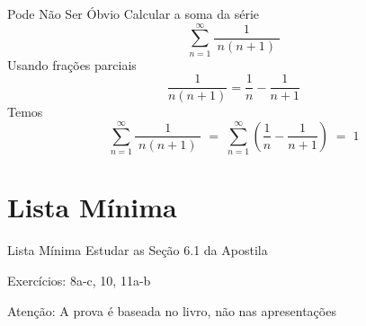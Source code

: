 \begin{frame}{Pode Não Ser Óbvio}
	Calcular a soma da série
	\[\sum_{n=1}^{\infty} \frac{1}{\;n(n+1)\;} \]
	\pause
	Usando frações parciais
	\[ \frac{1}{n(n+1)} = \frac{1}{n} - \frac{1}{n+1} \]
	\pause
	Temos
	\[
	\sum_{n=1}^{\infty} \frac{1}{\;n(n+1)\;}
	\;=\; \sum_{n=1}^{\infty} \left( \frac{1}{n} - \frac{1}{n+1} \right)
	\;=\; 1
	\]
\end{frame}

\section{Lista Mínima}

\begin{frame}{Lista Mínima}
  Estudar as Seção 6.1 da Apostila

  \vspace{\baselineskip}
  Exercícios: 8a-c, 10, 11a-b

  \vfill
  Atenção: A prova é baseada no livro, não nas apresentações
\end{frame}


